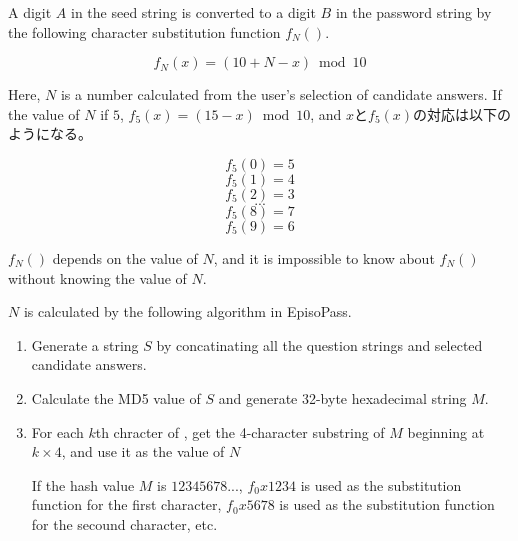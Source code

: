 \documentclass{article}
\begin{document}
A digit $A$ in the seed string is converted to a digit $B$
in the password string by the following
character substitution function $f_N()$.

\[ f_N(x) = (10 + N - x) \bmod 10 \]


Here, $N$ is a number calculated from the user's selection of
candidate answers.
If the value of $N$ if $5$, $f_5(x) = (15-x) \bmod 10$, and
$x$と$f_5(x)$の対応は以下のようになる。

\[ f_5(0) = 5 \]
\[ f_5(1) = 4 \]
\[ f_5(2) = 3 \]
\[ ... \]
\[ f_5(8) = 7 \]
\[ f_5(9) = 6 \]


$f_N()$ depends on the value of $N$, and
it is impossible to know about $f_N()$ without knowing the value of $N$.
 

$N$ is calculated by the following algorithm in EpisoPass.
 
\begin{enumerate}
  \item Generate a string $S$ by concatinating all the question strings and selected candidate answers.

  \item Calculate the MD5 value of $S$ and generate 32-byte hexadecimal string $M$.

  \item For each $k$th chracter of {\SS},
    get the 4-character substring of $M$ beginning at $k \times 4$, and use it as the value of $N$

    If the hash value $M$ is $12345678...$,
    $f_0x1234$ is used as the substitution function for the first character,
    $f_0x5678$ is used as the substitution function for the secound character, etc.
\end{enumerate}
\end{document}
